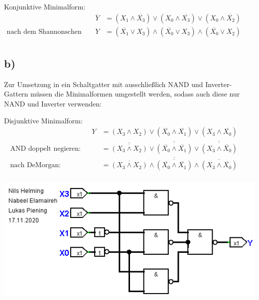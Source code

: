 \documentclass[]{article}
\newcommand{\V}{\lor}
\newcommand{\A}{\land}
\newcommand{\T}[1]{\overline{#1}}
\begin{document}
	Konjunktive Minimalform:
	\begin{align*}
		&& \T{Y} &= (X_1 \A \T{X_3}) \V (X_0 \A \T{X_3}) \V (X_0 \A \T{X_2}) &&\\
		\text{nach dem Shannonschen Gesetz:}&& Y &= (\T{X_1} \V X_3) \A (\T{X_0} \V X_3) \A (\T{X_0} \V X_2) &&\\
	\end{align*}
\subsection*{b)}
	Zur Umsetzung in ein Schaltgatter mit ausschließlich NAND und Inverter-Gattern müssen die Minimalformen umgestellt werden, sodass auch diese nur NAND und Inverter verwenden:

	Disjunktive Minimalform:
	\begin{align*}
		&&Y &= (X_3 \A X_2) \V (\T{X_0} \A \T{X_1}) \V (X_3 \A \T{X_0})&&\\
		\text{AND doppelt negieren:}&& &= \T{\T{(X_3 \A X_2)}} \V \T{\T{(\T{X_0} \A \T{X_1})}} \V \T{\T{(X_3 \A \T{X_0})}}&&\\
		\text{nach DeMorgan:}&& &= \T{\T{(X_3 \A X_2)} \A \T{(\T{X_0} \A \T{X_1})} \A \T{(X_3 \A \T{X_0})}}&&\\
	\end{align*}
	\begin{center}\includegraphics[scale=0.7]{Bilder/DisjunktiveNormalform.png}\end{center}
\end{document}
